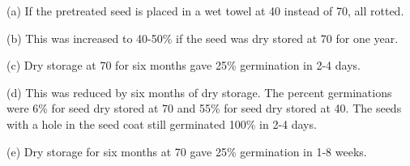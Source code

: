 \begin{table}[h!]
(a) If the pretreated seed is placed in a wet towel at 40 instead of 70, all rotted.

(b) This was increased to 40-50\% if the seed was dry stored at 70 for one year.

(c) Dry storage at 70 for six months gave 25\% germination in 2-4 days.

(d) This was reduced by six months of dry storage. The percent germinations
were 6\% for seed dry stored at 70 and 55\% for seed dry stored at 40. The seeds with
a hole in the seed coat still germinated 100\% in 2-4 days.

(e) Dry storage for six months at 70 gave 25\% germination in 1-8 weeks.
\end{table}

